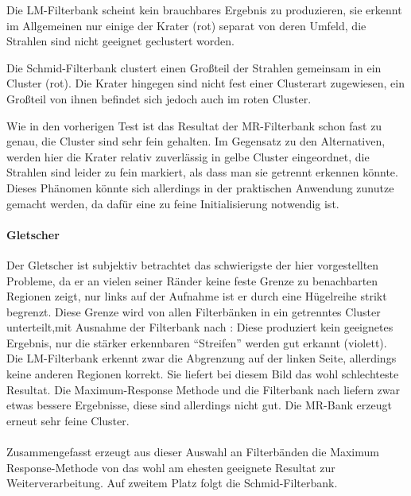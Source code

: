 Die LM-Filterbank scheint kein brauchbares Ergebnis zu produzieren, sie erkennt im Allgemeinen nur einige der Krater (rot) separat von deren Umfeld, die Strahlen sind nicht geeignet geclustert worden.

Die Schmid-Filterbank clustert einen Großteil der Strahlen gemeinsam in ein Cluster (rot). Die Krater hingegen sind nicht fest einer Clusterart zugewiesen, ein Großteil von ihnen befindet sich jedoch auch im roten Cluster.

Wie in den vorherigen Test ist das Resultat der MR-Filterbank schon fast zu genau, die Cluster sind sehr fein gehalten. Im Gegensatz zu den Alternativen, werden hier die Krater relativ zuverlässig in gelbe Cluster eingeordnet, die Strahlen sind leider zu fein markiert, als dass man sie getrennt erkennen könnte. Dieses Phänomen könnte sich allerdings in der praktischen Anwendung zunutze gemacht werden, da dafür eine zu feine Initialisierung notwendig ist.

\paragraph{Gletscher}

Der Gletscher ist subjektiv betrachtet das schwierigste der hier vorgestellten Probleme, da er an vielen seiner Ränder keine feste Grenze zu benachbarten Regionen zeigt, nur links auf der Aufnahme ist er durch eine Hügelreihe strikt begrenzt. Diese Grenze wird von allen Filterbänken in ein getrenntes Cluster unterteilt,mit Ausnahme der Filterbank nach \cite{jain_91}: Diese produziert kein geeignetes Ergebnis, nur die stärker erkennbaren \enquote{Streifen} werden gut erkannt (violett). Die LM-Filterbank erkennt zwar die Abgrenzung auf der linken Seite, allerdings keine anderen Regionen korrekt. Sie liefert bei diesem Bild das wohl schlechteste Resultat. Die Maximum-Response Methode und die Filterbank nach \cite{schmid_01} liefern zwar etwas bessere Ergebnisse, diese sind allerdings nicht gut. Die MR-Bank erzeugt erneut sehr feine Cluster.

\paragraph{}
Zusammengefasst erzeugt aus dieser Auswahl an Filterbänden die Maximum Response-Methode von \cite{visgeo} das wohl am ehesten geeignete Resultat zur Weiterverarbeitung. Auf zweitem Platz folgt die Schmid-Filterbank.


